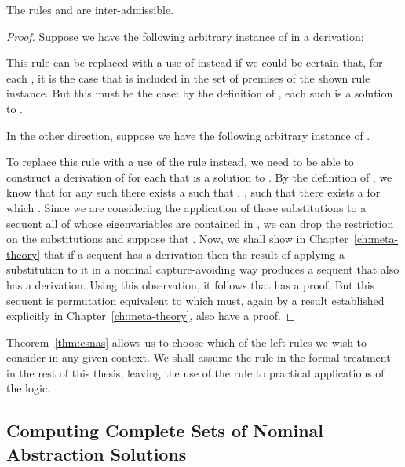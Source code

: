 \begin{theorem}\label{thm:csnas}
The rules  and  are inter-admissible.
\end{theorem}
\begin{proof}
Suppose we have the following arbitrary instance of  in a
derivation:

This rule can be replaced with a use of  instead if
we could be certain that, for each , it is
the case that  is included in the set of premises of the shown rule
instance. But this must be the case: by the
definition  of , each such  is a solution to .

In the other direction, suppose we have the following arbitrary
instance of .

To replace this rule with a use of the  rule
instead, we need to be able to construct a
derivation of  for
each  that is a solution to . By the definition of
, we know that for any such  there exists a  such that , \ie, such
that there
exists a  for which . Since we are considering the
application of these substitutions to a sequent all of whose
eigenvariables are contained in , we can drop the restriction
on the substitutions and suppose that . Now, we shall show in Chapter~\ref{ch:meta-theory} that if a
sequent has a derivation then the result of applying a substitution to
it in a nominal capture-avoiding way produces a sequent that also has
a derivation. Using this observation, it follows that
  has a proof. But this sequent is
permutation equivalent to  which must, again by a result established explicitly in
Chapter~\ref{ch:meta-theory}, also have a proof.
\end{proof}

Theorem~\ref{thm:csnas} allows us to choose which of the left rules we
wish to consider in any given context. We shall assume the 
rule in the formal treatment in the rest of this thesis, leaving the
use of the  rule to practical applications of the
logic.


\subsection{Computing Complete Sets of Nominal Abstraction
  Solutions}\label{ssec:complete-sets}

